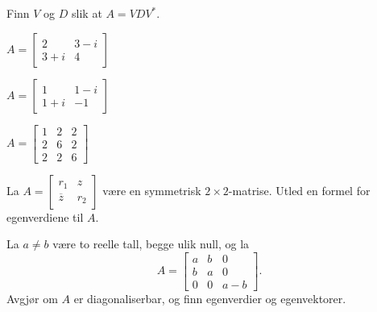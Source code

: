 \begin{oppgave}
Finn $V$ og $D$ slik at $A=VDV^*$.
\begin{punkt}
$
A=\begin{bmatrix}
2 & 3-i\\
3+i & 4
\end{bmatrix}
$
\end{punkt}
\begin{punkt}
$
A=\begin{bmatrix}
1 & 1-i\\
1+i & -1
\end{bmatrix}
$
\end{punkt}
\begin{punkt}
$
A=
\begin{bmatrix}
1 & 2 & 2\\
2 & 6 & 2\\
2 & 2 & 6
\end{bmatrix}
$ 
\end{punkt}
\end{oppgave}

\begin{oppgave}
La $A=\begin{bmatrix}
r_1 & z\\
\overline{z} & r_2
\end{bmatrix}$ være en symmetrisk $2 \times 2$-matrise. Utled en formel for egenverdiene til $A$.
\end{oppgave}

\begin{oppgave}
La $ a\neq b$ være to reelle tall, begge ulik null, og la
$$A=
\begin{bmatrix}
a & b & 0\\
b & a & 0\\
0 & 0 & a-b
\end{bmatrix}.$$
Avgjør om $A$ er diagonaliserbar, og finn egenverdier og egenvektorer.
\end{oppgave}



